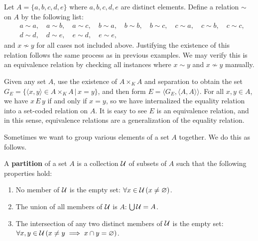 \begin{example}\label{ch1ex_rel_equivrel}
	Let $A = \{a, b, c, d, e\}$ where $a, b, c, d, e$ are distinct elements. 
	Define a relation $\sim$ on $A$ by the following list:
	\begin{align*}
		& a\sim a, \quad a\sim b, \quad a\sim c, \quad b\sim a, \quad b\sim b, \quad b\sim c, \quad c\sim a, \quad c\sim b, \quad c\sim c, \\
		& d\sim d, \quad d\sim e, \quad e\sim d, \quad e\sim e,
	\end{align*}
	and $x \not\sim y$ for all cases not included above. 
	Justifying the existence of this relation follows the same process as in previous examples.
	We may verify this is an equivalence relation by checking all instances where $x\sim y$ and $x\not\sim y$ manually. 
\end{example}

\begin{example}
	Given any set $A$, use the existence of $A\times_{K} A$ and separation to obtain the set $G_{E} = \{ \langle x, y\rangle\in A\times_{K} A \,|\, x=y \}$, and then form $E = \langle G_{E}, \langle A, A\rangle\rangle$. 
	For all $x, y\in A$, we have $x\, E\, y$ if and only if $x = y$, so we have internalized the equality relation into a set-coded relation on $A$. 
	It is easy to see $E$ is an equivalence relation, and in this sense, equivalence relations are a generalization of the equality relation. 
\end{example}

Sometimes we want to group various elements of a set $A$ together.
We do this as follows.

\begin{definition}
	A \textbf{partition} of a set $A$ is a collection $\mathcal{U}$ of subsets of $A$ such that the following properties hold:
	\begin{enumerate}[itemsep=-0.4ex, label=(\alph*)]
		\item No member of $\mathcal{U}$ is the empty set: $\forall x\in\mathcal{U}\, (x\ne\varnothing)$.
		\item The union of all members of $\mathcal{U}$ is $A$: $\bigcup\mathcal{U} = A$.
		\item The intersection of any two distinct members of $\mathcal{U}$ is the empty set: $\forall x, y\in\mathcal{U}\, (x\ne y\implies x\cap y = \varnothing)$.
	\end{enumerate}
\end{definition}

